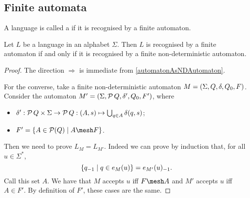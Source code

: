\subsection{Finite automata}
\begin{definition}
A language is called a  if it is recognised by a finite automaton.
\end{definition}

\begin{proposition}
Let $L$ be a language in an alphabet $\Sigma$. Then $L$ is recognised by a finite automaton \textup{if and only if} it is recognised by a finite non-deterministic automaton.
\end{proposition}
\begin{proof}
The direction $\Rightarrow$ is immediate from \ref{automatonAsNDAutomaton}.

For the converse, take a finite non-deterministic automaton $M = \sSet{\Sigma, Q, \delta, Q_0, F}$. Consider the automaton $M' = \sSet{\Sigma, \powerset{Q}, \delta', Q_0, F'}$, where
\begin{itemize}
\item $\delta': \operatorname{\mathcal{P}}{Q} \times \Sigma \to \operatorname{\mathcal{P}}{Q}: (A,s) \mapsto \bigcup_{q\in A}\delta(q, s)$;
\item $F' = \setbuilder{A\in \powerset(Q)}{A\mesh F}$.
\end{itemize}
Then we need to prove $L_{M} = L_{M'}$. Indeed we can prove by induction that, for all $u\in \Sigma^*$,
\[ \setbuilder{q_{-1}}{q\in e_M(u)} = e_{M'}(u)_{-1}. \]
Call this set $A$. We have that $M$ accepts $u$ iff $F\mesh A$ and $M'$ accepts $u$ iff $A\in F'$. By definition of $F'$, these cases are the same.
\end{proof}


